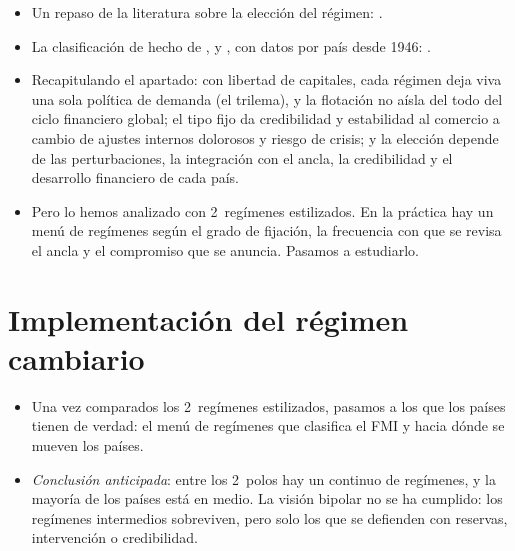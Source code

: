 \documentclass[11pt]{article}
\begin{document}
\begin{anotaciones}
\begin{itemize}
\item Un repaso de la literatura sobre la elección del régimen: \textcite{Ouchen2013Optimal}.
\item La clasificación de hecho de ,  y , con datos por país desde 1946: \textcite{IRR2026Datos}.
\end{itemize}
\end{anotaciones}

\begin{itemize}
\item Recapitulando el apartado: con libertad de capitales, cada régimen deja viva una sola política de demanda (el trilema), y la flotación no aísla del todo del ciclo financiero global; el tipo fijo da credibilidad y estabilidad al comercio a cambio de ajustes internos dolorosos y riesgo de crisis; y la elección depende de las perturbaciones, la integración con el ancla, la credibilidad y el desarrollo financiero de cada país.
\item Pero lo hemos analizado con 2~regímenes estilizados. En la práctica hay un menú de regímenes según el grado de fijación, la frecuencia con que se revisa el ancla y el compromiso que se anuncia. Pasamos a estudiarlo.
\end{itemize}

\section{Implementación del régimen cambiario}\label{sec:implementacion}

\begin{itemize}
\item Una vez comparados los 2~regímenes estilizados, pasamos a los que los países tienen de verdad: el menú de regímenes que clasifica el FMI y hacia dónde se mueven los países.
\item \emph{Conclusión anticipada}: entre los 2~polos hay un continuo de regímenes, y la mayoría de los países está en medio. La visión bipolar no se ha cumplido: los regímenes intermedios sobreviven, pero solo los que se defienden con reservas, intervención o credibilidad.
\end{itemize}

\end{document}
